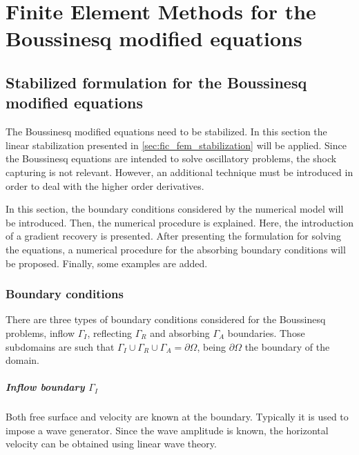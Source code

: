 
\chapter{Finite Element Methods for the Boussinesq modified equations}
\label{eulerian_bsq}



\section{Stabilized formulation for the Boussinesq modified equations}


The Boussinesq modified equations need to be stabilized. In this section the linear stabilization presented in \ref{sec:fic_fem_stabilization} will be applied. Since the Boussinesq equations are intended to solve oscillatory problems, the shock capturing is not relevant. However, an additional technique must be introduced in order to deal with the higher order derivatives.

In this section, the boundary conditions considered by the numerical model will be introduced. Then, the numerical procedure is explained. Here, the introduction of a gradient recovery is presented. After presenting the formulation for solving the equations, a numerical procedure for the absorbing boundary conditions will be proposed. Finally, some examples are added.



\subsection{Boundary conditions}


There are three types of boundary conditions considered for the Boussinesq problems, inflow $\Gamma_I$, reflecting $\Gamma_R$ and absorbing $\Gamma_A$ boundaries. Those subdomains are such that $\Gamma_I \cup \Gamma_R \cup \Gamma_A = \partial \Omega$, being $\partial\Omega$ the boundary of the domain.

\paragraph{Inflow boundary $\Gamma_I$} Both free surface and velocity are known at the boundary. Typically it is used to impose a wave generator. Since the wave amplitude is known, the horizontal velocity can be obtained using linear wave theory.

